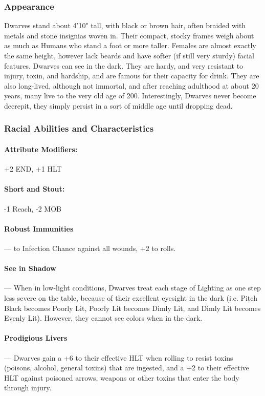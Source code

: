 \documentclass[oneside,11pt,english]{book}
\begin{document}
\subsubsection*{Appearance} 
Dwarves stand about 4'10" tall, with black or brown hair, often braided with metals and stone insignias 
woven in. Their compact, stocky frames weigh about as much as Humans who stand a foot or more taller. 
Females are almost exactly the same height, however lack beards and have softer (if still very sturdy) 
facial features. Dwarves can see in the dark. They are hardy, and very resistant to injury, toxin, and 
hardship, and are famous for their capacity for drink. They are also long-lived, although not immortal, and 
after reaching adulthood at about 20 years, many live to the very old age of 200. Interestingly, Dwarves 
never become decrepit, they simply persist in a sort of middle age until dropping dead. 
\subsubsection*{Racial Abilities and Characteristics} 
\paragraph{Attribute Modifiers:} +2 END, +1 HLT 
\paragraph{Short and Stout:}
-1 Reach, -2 MOB 
\paragraph{Robust Immunities}--- to Infection Chance against all wounds, +2 to  rolls. 
\paragraph{See in Shadow}\label{par:Dwarf - See in Shadow}
---\quad
When in low-light conditions, Dwarves treat each stage of Lighting as one step less severe on the 
table, because of their excellent eyesight in the dark (i.e. Pitch Black becomes Poorly Lit, Poorly 
Lit becomes Dimly Lit, and Dimly Lit becomes Evenly Lit). However, they cannot see colors 
when in the dark. 
\paragraph{Prodigious Livers}---\quad
Dwarves gain a +6 to their effective HLT when rolling to resist toxins (poisons, alcohol, general toxins) that are ingested, and a +2 to their effective HLT against poisoned arrows, weapons or other toxins that enter the body through injury.
\end{document}
